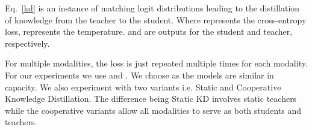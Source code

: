 \documentclass[final]{cvpr}
\begin{document}
Eq.~\eqref{kd} is an instance of matching logit distributions leading to the distillation of knowledge from the teacher to the student. Where  represents the cross-entropy loss,  represents the temperature.  and  are outputs for the student and teacher, respectively.

For multiple modalities, the loss is just repeated multiple times for each modality. For our experiments we use  and . We choose  as the models are similar in capacity. We also experiment with two variants i.e. Static and Cooperative Knowledge Distillation. The difference being Static KD involves static teachers while the cooperative variants allow all modalities to serve as both students and teachers.









 
 
\end{document}
